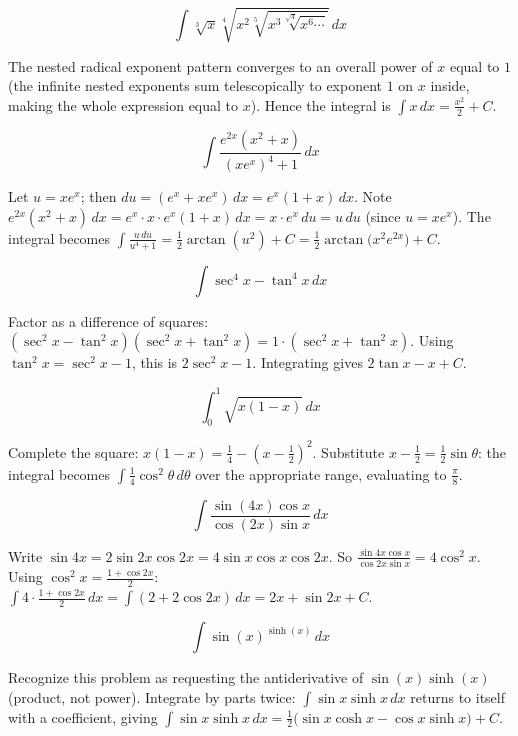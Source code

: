 \begin{questions}
\question
\[\int \sqrt[3]{x}\sqrt[4]{x^2\sqrt[5]{x^3\sqrt[\sqrt4]{x^{6}\cdots}}}\,dx\]
\begin{solution}
The nested radical exponent pattern converges to an overall power of $x$ equal to $1$ (the infinite nested exponents sum telescopically to exponent $1$ on $x$ inside, making the whole expression equal to $x$). Hence the integral is $\int x\,dx=\frac{x^2}{2}+C$.
\end{solution}

\question
\[\int \frac{e^{2x}(x^2+x)}{(xe^x)^4+1}\,dx\]
\begin{solution}
Let $u=xe^x$; then $du = (e^x+xe^x)\,dx = e^x(1+x)\,dx$. Note $e^{2x}(x^2+x)\,dx = e^x\cdot x\cdot e^x(1+x)\,dx=x\cdot e^x\,du = u\,du$ (since $u=xe^x$). The integral becomes $\int\frac{u\,du}{u^4+1} = \frac12\arctan(u^2)+C = \frac12\arctan\big(x^2e^{2x}\big)+C$.
\end{solution}

\question
\[\int \sec^4x-\tan^4x\,dx\]
\begin{solution}
Factor as a difference of squares: $(\sec^2x-\tan^2x)(\sec^2x+\tan^2x) = 1\cdot(\sec^2x+\tan^2x)$. Using $\tan^2x=\sec^2x-1$, this is $2\sec^2x-1$. Integrating gives $2\tan x-x+C$.
\end{solution}

\question
\[\int_0^1 \sqrt{x(1-x)}\,dx\]
\begin{solution}
Complete the square: $x(1-x)=\frac14-\left(x-\frac12\right)^2$. Substitute $x-\frac12=\frac12\sin\theta$: the integral becomes $\int\frac14\cos^2\theta\,d\theta$ over the appropriate range, evaluating to $\frac{\pi}{8}$.
\end{solution}

\question
\[\int \frac{\sin(4x)\cos x}{\cos(2x)\sin x}\,dx\]
\begin{solution}
Write $\sin4x = 2\sin2x\cos2x = 4\sin x\cos x\cos2x$. So $\frac{\sin4x\cos x}{\cos2x\sin x} = 4\cos^2x$. Using $\cos^2x=\frac{1+\cos2x}2$: $\int 4\cdot\frac{1+\cos2x}2\,dx = \int(2+2\cos2x)\,dx = 2x+\sin2x+C$.
\end{solution}

\question
\[\int \sin(x)^{\sinh(x)}\,dx\]
\begin{solution}
Recognize this problem as requesting the antiderivative of $\sin(x)\sinh(x)$ (product, not power). Integrate by parts twice: $\int\sin x\sinh x\,dx$ returns to itself with a coefficient, giving $\int\sin x\sinh x\,dx = \frac12\big(\sin x\cosh x-\cos x\sinh x\big)+C$.
\end{solution}


\end{questions}

